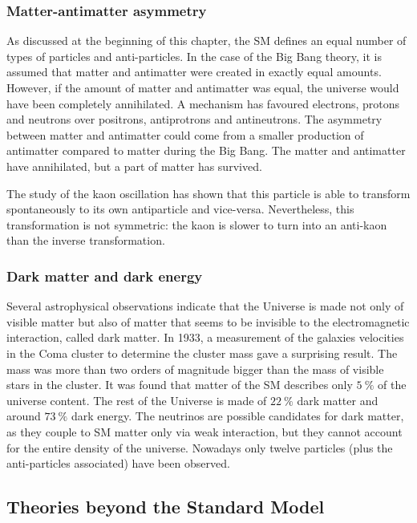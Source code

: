       \subsubsection{Matter-antimatter asymmetry}

      As discussed at the beginning of this chapter, the \gls{SM} defines an equal number of types of particles and anti-particles. 
      In the case of the Big Bang theory, it is assumed that matter and antimatter were created in exactly equal amounts.
      However, if the amount of matter and antimatter was equal, the universe would have been completely annihilated.
      A mechanism has favoured electrons, protons and neutrons over positrons, antiprotrons and antineutrons.
      The asymmetry between matter and antimatter could come from a smaller production of antimatter compared to matter during the Big Bang.
      The matter and antimatter have annihilated, but a part of matter has survived. 

      The study of the kaon oscillation has shown that this particle is able to transform spontaneously to its own antiparticle and vice-versa.
      Nevertheless, this transformation is not symmetric: the kaon is slower to turn into an anti-kaon than the inverse transformation.

      \subsubsection{Dark matter and dark energy}
      
      Several astrophysical observations indicate that the Universe is made not only of visible matter but also of matter that seems to be invisible to the electromagnetic interaction, called dark matter.
      In 1933, a measurement of the galaxies velocities in the Coma cluster to determine the cluster mass gave a surprising result.
      The mass was more than two orders of magnitude bigger than the mass of visible stars in the cluster.
      It was found that  matter of the \gls{SM} describes only $5~\%$ of the universe content. 
      The rest of the Universe is made of $22~\%$ dark matter and around $73~\%$ dark energy.
      The neutrinos are possible candidates for dark matter, as they couple to \gls{SM} matter only via weak interaction, but they cannot account for the entire density of the universe.
      Nowadays only twelve particles (plus the anti-particles associated) have been observed. 

    \subsection{Theories beyond the Standard Model}

